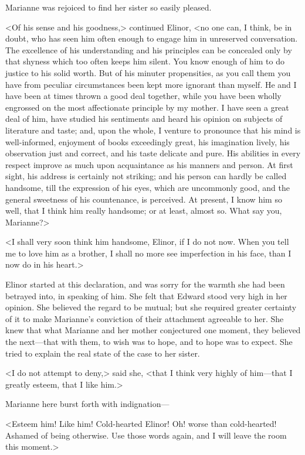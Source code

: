 Marianne was rejoiced to find her sister so easily pleased.

<Of his sense and his goodness,> continued Elinor, <no one can, I think, be in doubt, who has seen him often enough to engage him in unreserved conversation. The excellence of his understanding and his principles can be concealed only by that shyness which too often keeps him silent. You know enough of him to do justice to his solid worth. But of his minuter propensities, as you call them you have from peculiar circumstances been kept more ignorant than myself. He and I have been at times thrown a good deal together, while you have been wholly engrossed on the most affectionate principle by my mother. I have seen a great deal of him, have studied his sentiments and heard his opinion on subjects of literature and taste; and, upon the whole, I venture to pronounce that his mind is well-informed, enjoyment of books exceedingly great, his imagination lively, his observation just and correct, and his taste delicate and pure. His abilities in every respect improve as much upon acquaintance as his manners and person. At first sight, his address is certainly not striking; and his person can hardly be called handsome, till the expression of his eyes, which are uncommonly good, and the general sweetness of his countenance, is perceived. At present, I know him so well, that I think him really handsome; or at least, almost so. What say you, Marianne?>

<I shall very soon think him handsome, Elinor, if I do not now. When you tell me to love him as a brother, I shall no more see imperfection in his face, than I now do in his heart.>

Elinor started at this declaration, and was sorry for the warmth she had been betrayed into, in speaking of him. She felt that Edward stood very high in her opinion. She believed the regard to be mutual; but she required greater certainty of it to make Marianne's conviction of their attachment agreeable to her. She knew that what Marianne and her mother conjectured one moment, they believed the next—that with them, to wish was to hope, and to hope was to expect. She tried to explain the real state of the case to her sister.

<I do not attempt to deny,> said she, <that I think very highly of him—that I greatly esteem, that I like him.>

Marianne here burst forth with indignation—

<Esteem him! Like him! Cold-hearted Elinor! Oh! worse than cold-hearted! Ashamed of being otherwise. Use those words again, and I will leave the room this moment.>


